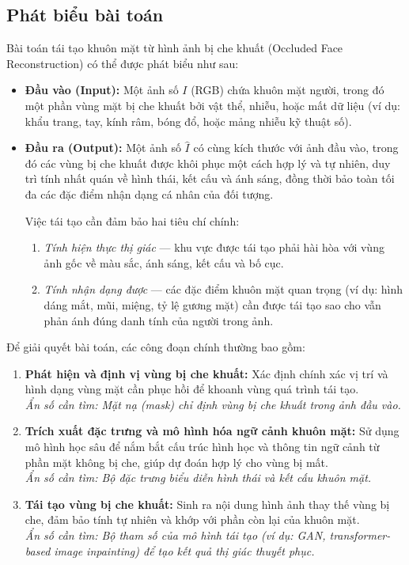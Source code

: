 \documentclass[12pt,a4paper]{article}
\begin{document}
	\subsection{Phát biểu bài toán}
	Bài toán tái tạo khuôn mặt từ hình ảnh bị che khuất (Occluded Face Reconstruction) có thể được phát biểu như sau:
	
	\begin{itemize}
		\item \textbf{Đầu vào (Input):} Một ảnh số $I$ (RGB) chứa khuôn mặt người, trong đó một phần vùng mặt bị che khuất bởi vật thể, nhiễu, hoặc mất dữ liệu (ví dụ: khẩu trang, tay, kính râm, bóng đổ, hoặc mảng nhiễu kỹ thuật số).
		\item \textbf{Đầu ra (Output):} Một ảnh số $\hat{I}$ có cùng kích thước với ảnh đầu vào, trong đó các vùng bị che khuất được khôi phục một cách hợp lý và tự nhiên, duy trì tính nhất quán về hình thái, kết cấu và ánh sáng, đồng thời bảo toàn tối đa các đặc điểm nhận dạng cá nhân của đối tượng.  
		
		Việc tái tạo cần đảm bảo hai tiêu chí chính: 
		\begin{enumerate}
			\item \textit{Tính hiện thực thị giác} — khu vực được tái tạo phải hài hòa với vùng ảnh gốc về màu sắc, ánh sáng, kết cấu và bố cục.
			\item \textit{Tính nhận dạng được} — các đặc điểm khuôn mặt quan trọng (ví dụ: hình dáng mắt, mũi, miệng, tỷ lệ gương mặt) cần được tái tạo sao cho vẫn phản ánh đúng danh tính của người trong ảnh.
		\end{enumerate}
	\end{itemize}
	
	Để giải quyết bài toán, các công đoạn chính thường bao gồm:
	
	\begin{enumerate}
		\item \textbf{Phát hiện và định vị vùng bị che khuất:} Xác định chính xác vị trí và hình dạng vùng mặt cần phục hồi để khoanh vùng quá trình tái tạo.\\
		\textit{Ẩn số cần tìm: Mặt nạ (mask) chỉ định vùng bị che khuất trong ảnh đầu vào.}
		
		\item \textbf{Trích xuất đặc trưng và mô hình hóa ngữ cảnh khuôn mặt:} Sử dụng mô hình học sâu để nắm bắt cấu trúc hình học và thông tin ngữ cảnh từ phần mặt không bị che, giúp dự đoán hợp lý cho vùng bị mất.\\
		\textit{Ẩn số cần tìm: Bộ đặc trưng biểu diễn hình thái và kết cấu khuôn mặt.}
		
		\item \textbf{Tái tạo vùng bị che khuất:} Sinh ra nội dung hình ảnh thay thế vùng bị che, đảm bảo tính tự nhiên và khớp với phần còn lại của khuôn mặt.\\
		\textit{Ẩn số cần tìm: Bộ tham số của mô hình tái tạo (ví dụ: GAN, transformer-based image inpainting) để tạo kết quả thị giác thuyết phục.}
	\end{enumerate}
	
\end{document}
